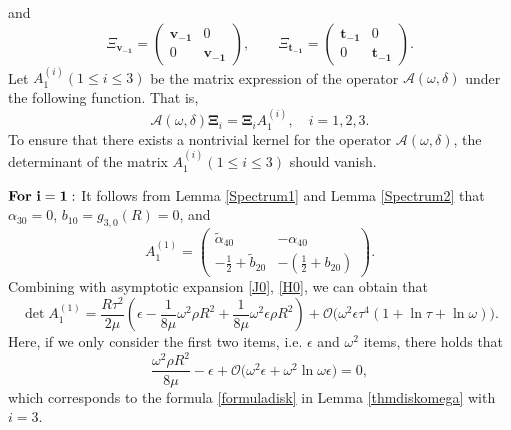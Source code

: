 \documentclass[10pt,reqno,oneside]{amsart}%
\theoremstyle{definition}
\theoremstyle{remark}
\numberwithin{equation}{section}
\numberwithin{equation}{section}
\begin{document}
and
\begin{equation}
\Xi_{\boldsymbol{ v_{-1}}}=
\begin{pmatrix}
\boldsymbol{v_{-1}}& 0 \\
0&\boldsymbol{v_{-1}}
\end{pmatrix},\quad\quad
\Xi_{\boldsymbol{ t_{-1}}}=
\begin{pmatrix}
\boldsymbol{t_{-1}}& 0 \\
0&\boldsymbol{t_{-1}}
\end{pmatrix}.\nonumber
\end{equation}
Let $A_1^{(i)}(1\leq i\leq 3)$ be the matrix expression of the operator $\mathcal{A}(\omega,\delta)$ under the following function. That is,
$$
\mathcal{A}(\omega,\delta)\boldsymbol{\Xi}_i=\boldsymbol{\Xi}_i A_1^{(i)},\quad i=1,2,3.
$$
To ensure that there exists a nontrivial kernel for the operator $\mathcal{A}(\omega,\delta)$, the determinant
of the matrix $A_1^{(i)}(1\leq i\leq3)$ should vanish.

$\bf{For \ i=1:}$ It follows from Lemma \ref{Spectrum1} and Lemma \ref{Spectrum2} that $\alpha_{30}=0$, $b_{10}=g_{3,0}(R)=0$, and
\begin{equation}\label{A1}
A_1^{(1)}=
\begin{pmatrix}
\tilde{\alpha}_{40} &-\alpha_{40}\\
-\frac{1}{2}+\tilde{b}_{20}  &-(\frac{1}{2}+b_{20})
\end{pmatrix}.%
\end{equation}
Combining with asymptotic expansion \eqref{J0}, \eqref{H0}, we can obtain that
$$
\det A_1^{(1)}=\frac{R\tau^2}{2\mu}\left(\epsilon-\frac{1}{8\mu}\omega^2\rho R^2+\frac{1}{8\mu}\omega^2\epsilon\rho R^2\right)+\mathcal{O}\Big({\omega^2\epsilon\tau^4(1+\ln \tau+\ln \omega)}\Big).
$$
Here, if we only consider the first two items, i.e. $\epsilon$ and $\omega^2$ items, there holds that
$$
\frac{\omega^2\rho R^2}{8\mu}-\epsilon+\mathcal{O}\Big(\omega^2\epsilon+\omega^2\ln\omega\epsilon\Big)=0,
$$
which corresponds to the formula \eqref{formuladisk} in Lemma \ref{thmdiskomega} with $i=3$.
\end{document}
